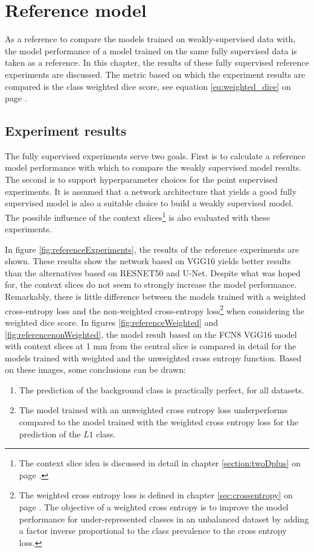 \chapter{Reference model\label{sec:reference_model}}\thispagestyle{empty}
\par{
    As a reference to compare the models trained on weakly-supervised data with, the model performance of a model trained on the same fully supervised data is taken as a reference.
    In this chapter, the results of these fully supervised reference experiments are discussed.
    The metric based on which the experiment results are compared is the class weighted dice score, see equation \ref{eq:weighted_dice} on page \pageref{eq:weighted_dice}.
}

\section{Experiment results}
\par{
    The fully supervised experiments serve two goals.
    First is to calculate a reference model performance with which to compare the weakly supervised model results.
    The second is to support hyperparameter choices for the point supervised experiments.
    It is assumed that a network architecture that yields a good fully supervised model is also a suitable choice to build a weakly supervised model.
    The possible influence of the context slices\footnote{The context slice idea is discussed in detail in chapter \ref{section:twoDplus} on page \pageref{section:twoDplus}.} is also evaluated with these experiments.
}
\par{
    In figure \ref{fig:referenceExperiments}, the results of the reference experiments are shown.
    These results show the network based on VGG16 yields better results than the alternatives based on RESNET50 and U-Net.
    Despite what was hoped for, the context slices do not seem to strongly increase the model performance.
    Remarkably, there is little difference between the models trained with a weighted cross-entropy loss and the non-weighted cross-entropy loss\footnote{
        The weighted cross entropy loss is defined in chapter \ref{sec:crossentropy} on page \pageref{sec:crossentropy}. 
        The objective of a weighted cross entropy is to improve the model performance for under-represented classes in an unbalanced dataset by adding a factor inverse proportional to the class prevalence to the cross entropy loss.
    } when considering the weighted dice score.
    In figures \ref{fig:referenceWeighted} and \ref{fig:referencenonWeighted}, the model result based on the FCN8 VGG16 model with context slices at 1 mm from the central slice is compared in detail for the models trained with weighted and the unweighted cross entropy function.
    Based on these images, some conclusions can be drawn:
    \begin{enumerate}
        \item The prediction of the background class is practically perfect, for all datasets.
        \item The model trained with an unweighted cross entropy loss underperforms compared to the model trained with the weighted cross entropy loss for the prediction of the $L1$ class.
    \end{enumerate}
}
